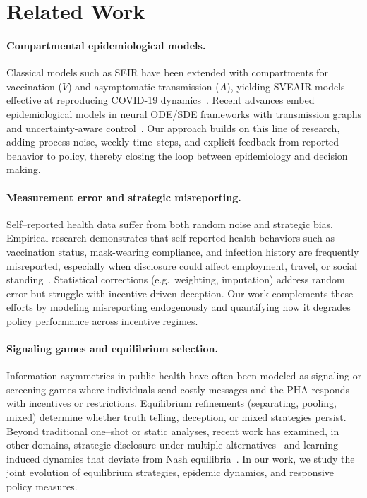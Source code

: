 \documentclass[sigconf,review]{acmart}
\begin{document}
\section{Related Work}
\paragraph{Compartmental epidemiological models.} Classical models such as SEIR have been extended with compartments for vaccination ($V$) and asymptomatic transmission ($A$), yielding SVEAIR models effective at reproducing COVID-19 dynamics~\cite{ChoiJTB2020}.
Recent advances embed epidemiological models in neural ODE/SDE frameworks with transmission graphs and uncertainty-aware control~\cite{thiagarajan2022machine,EARTH2025,nSDE2025}.
Our approach builds on this line of research, adding process noise, weekly time–steps, and explicit feedback from reported behavior to policy, thereby closing the loop between epidemiology and decision making.

\paragraph{Measurement error and strategic misreporting.}
Self–reported health data suffer from both random noise and strategic bias.  
Empirical research demonstrates that self-reported health behaviors such as vaccination status, mask-wearing compliance, and infection history are frequently misreported, especially when disclosure could affect employment, travel, or social standing~\cite{Battaglia1997,Merrell2024}.
Statistical corrections (e.g.\ weighting, imputation) address random error but struggle with incentive-driven deception. Our work complements these efforts by modeling misreporting endogenously and quantifying how it degrades policy performance across incentive regimes.

\paragraph{Signaling games and equilibrium selection.}
Information asymmetries in public health have often been modeled as signaling or screening games where individuals send costly messages and the PHA responds with incentives or restrictions.
Equilibrium refinements (separating, pooling, mixed) determine whether truth telling, deception, or mixed strategies persist.
Beyond traditional one–shot or static analyses, recent work has examined, in other domains, strategic disclosure under multiple alternatives~\cite{AAAI2024Disclosure} and learning-induced dynamics that deviate from Nash equilibria~\cite{IJCAI2023MultiMemory}.
In our work,
we study the joint evolution of equilibrium strategies, epidemic dynamics, and responsive policy measures.
\end{document}
